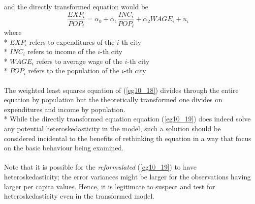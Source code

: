 \documentclass[11pt]{article}
\begin{document}
and the directly transformed equation would be 
\begin{equation}
\frac{EXP_i}{POP_i} =  \alpha_0 + \alpha_1\frac{INC_i}{POP_i} + \alpha_2WAGE_i + u_i \label{eg10_19}
\end{equation}
where\\*
$EXP_i$ refers to expenditures of the $i$-th city\\*
$INC_i$ refers to income of the $i$-th city\\*
$WAGE_i$ refers to average wage of the $i$-th city\\*
$POP_i$ refers to the population of the $i$-th city\\ \\
The weighted least squares equation of (\ref{eg10_18}) divides through the entire equation by population but the theoretically transformed one divides on expenditures and income by population.\\*
While the directly transformed equation equation (\ref{eg10_19}) does indeed solve any potential heteroskedasticity in the model, such a solution should be considered incidental to the benefits of rethinking th equation in a way that focus on the basic behaviour being examined.\\ \\
Note that it is possible for the \textit{reformulated} (\ref{eg10_19}) to have heteroskedasticity; the error variances might be larger for the observations having larger per capita values. Hence, it is legitimate to suspect and test for heteroskedasticity even in the transformed model.
\end{document}
